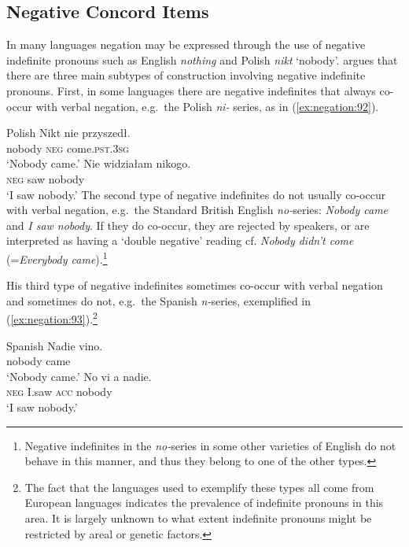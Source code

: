 \documentclass[output=paper,hidelinks]{langscibook}
\begin{document}
\subsection{Negative Concord Items}
\label{sec:negation:pronouns}

In many languages negation may be expressed through the use of negative indefinite pronouns such as English \emph{nothing} and Polish \emph{nikt} `nobody'. \citet{Haspelmath:97} argues that there are three main subtypes of construction involving negative indefinite pronouns. First, in some languages there are negative indefinites that always co-occur with verbal negation, e.g.\ the Polish \emph{ni-} series, as in (\ref{ex:negation:92}).

\ea\label{ex:negation:92} Polish \citep [194] {Haspelmath:97}
\ea	 
\gll Nikt nie przyszedł.  \\
nobody	\textsc{neg} come.\textsc{pst.3sg}	\\			
\glt `Nobody came.’ 
\ex
\gll  Nie	 widziałam 	nikogo.	\\
\textsc{neg}	saw		nobody\\
\glt `I saw nobody.’
\z\z
The second type of negative indefinites do not usually co-occur with verbal negation, e.g.\ the Standard British English \emph{no-}series: \emph{Nobody came} and \emph{I saw nobody}. If they do co-occur, they are rejected by speakers, or are interpreted as having a `double negative' reading cf. \emph{Nobody didn’t come} (=\emph{Everybody came}).\footnote{Negative indefinites in the \emph{no-}series in some other varieties of English do not behave in this manner, and thus they belong to one of the other types.}

His third type of negative indefinites sometimes co-occur with verbal negation and sometimes do not, e.g.\ the Spanish \emph{n-}series, exemplified in (\ref{ex:negation:93}).\footnote{The fact that the languages used to exemplify these types all come from European languages indicates the prevalence of indefinite pronouns in this area. It is largely unknown to what extent indefinite pronouns might be restricted by areal or genetic factors.} 

\ea\label{ex:negation:93} Spanish \citep [201] {Haspelmath:97}
\ea 
\gll 	Nadie		vino.	\\													
nobody		came		\\															
\glt `Nobody came.’
\ex
\gll 	No	vi			a			nadie.\\
\textsc{neg}	I.saw 	\textsc{acc}	nobody\\
\glt`I saw nobody.’
\z\z
\end{document}
